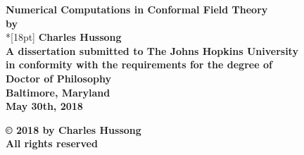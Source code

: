 \documentclass[12pt]{report}
\numberwithin{equation}{section}
\begin{document}
\newcommand{\bm}[1]{ \mbox{\boldmath $ #1 $} }
\newcommand{\bin}[2]{\left(\begin{array}{@{}c@{}} #1 \\ #2
             \end{array}\right) }
\renewcommand{\contentsname}{Table of Contents}
\baselineskip=24pt
 
\thispagestyle{empty}
\begin{center}
\vspace*{.25in}
{\bf\LARGE{ Numerical Computations in Conformal Field Theory }}\\
\vspace*{.75in}
{\bf by} \\*[18pt]
\vspace*{.2in}
{\bf Charles Hussong}\\
\vspace*{1in}
{\bf A dissertation submitted to The Johns Hopkins University\\
in conformity with the requirements for the degree of\\
Doctor of Philosophy }\\
\vspace*{.75in}
{\bf Baltimore, Maryland} \\
{\bf May 30th, 2018} \\     %
\vspace*{.5in}
\begin{small}
{\bf \copyright{ }2018 by Charles Hussong} \\
{\bf All rights reserved}
\end{small}
\end{center}
\newpage 

\pagestyle{plain}
\setcounter{page}{2}




\pagestyle{plain}
\baselineskip=24pt
\tableofcontents
\listoftables
\listoffigures
\end{document}
